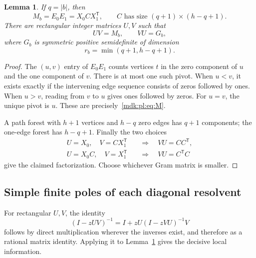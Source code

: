 \documentclass[11pt,letterpaper]{article}
\numberwithin{equation}{section}
\newtheorem{lemma}[theorem]{Lemma}
\theoremstyle{remark}\newtheorem{remark}[theorem]{Remark}
\begin{document}
\begin{lemma}\label{mdk:pl:lem:gram}
If $q=|b|$, then
\begin{equation}\label{mdk:pl:eq:factorization}
 M_b=E_0E_1=X_0CX_1^{\mathsf T},\qquad
 C\text{ has size }(q+1)\times(h-q+1).
\end{equation}
There are rectangular integer matrices $U,V$ such that
\begin{equation}\label{mdk:pl:eq:UV}
 UV=M_b,\qquad VU=G_b,
\end{equation}
where $G_b$ is symmetric positive semidefinite of dimension
\begin{equation}\label{mdk:pl:eq:dimension}
 r_b=\min(q+1,h-q+1).
\end{equation}
\end{lemma}
\begin{proof}
The $(u,v)$ entry of $E_0E_1$ counts vertices $t$ in the zero component of $u$ and the one component of $v$. There is at most one such pivot. When $u<v$, it exists exactly if the intervening edge sequence consists of zeros followed by ones. When $u>v$, reading from $v$ to $u$ gives ones followed by zeros. For $u=v$, the unique pivot is $u$. These are precisely~\eqref{mdk:pl:eq:M}.

A path forest with $h+1$ vertices and $h-q$ zero edges has $q+1$ components; the one-edge forest has $h-q+1$. Finally the two choices
\begin{align*}
 U=X_0,\quad V=CX_1^{\mathsf T}&\quad\Longrightarrow\quad VU=CC^{\mathsf T},\\
 U=X_0C,\quad V=X_1^{\mathsf T}&\quad\Longrightarrow\quad VU=C^{\mathsf T}C
\end{align*}
give the claimed factorization. Choose whichever Gram matrix is smaller.
\end{proof}

\subsection{Simple finite poles of each diagonal resolvent}
For rectangular $U,V$, the identity
\begin{equation}\label{mdk:pl:eq:resolventUV}
 (I-zUV)^{-1}=I+zU(I-zVU)^{-1}V
\end{equation}
follows by direct multiplication wherever the inverses exist, and therefore as a rational matrix identity. Applying it to Lemma~\ref{mdk:pl:lem:gram} gives the decisive local information.
\end{document}
